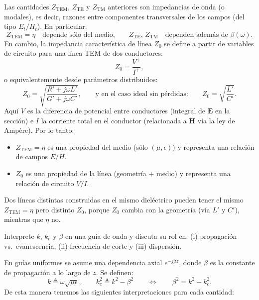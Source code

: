 \documentclass[
  11pt,
  letterpaper,
   addpoints,
   answers
  ]{exam}
\begin{document}
\begin{questions}
\begin{parts}
\begin{subparts}
\begin{solution}
\vspace{10pt}
\noindent
Las cantidades $Z_{\mathrm{TEM}}$, $Z_{\mathrm{TE}}$ y $Z_{\mathrm{TM}}$ anteriores son impedancias de onda (o modales), es decir, razones entre
componentes transversales de los campos (del tipo $E_t/H_t$). En particular:
\[
Z_{\mathrm{TEM}}=\eta \quad \text{depende sólo del medio,}
\qquad
Z_{\mathrm{TE}},\,Z_{\mathrm{TM}} \quad \text{dependen además de } \beta(\omega).
\]
En cambio, la impedancia característica de línea $Z_0$ se define a partir de variables de circuito para una línea TEM de dos conductores:
\begin{equation}
Z_0=\frac{V^+}{I^+},
\end{equation}
o equivalentemente desde parámetros distribuidos:
\begin{equation}
Z_0=\sqrt{\frac{R'+j\omega L'}{G'+j\omega C'}},
\qquad
\text{y en el caso ideal sin pérdidas:}\qquad
Z_0=\sqrt{\frac{L'}{C'}}.
\end{equation}
Aquí $V$ es la diferencia de potencial entre conductores (integral de $\mathbf{E}$ en la sección) e $I$ la corriente total en el conductor (relacionada a
$\mathbf{H}$ vía la ley de Ampère). Por lo tanto:

\begin{itemize}
\item $Z_{\mathrm{TEM}}=\eta$ es una propiedad del medio (sólo $(\mu,\epsilon)$) y representa una relación de campos $E/H$.
\item $Z_0$ es una propiedad de la línea (geometría + medio) y representa una relación de circuito $V/I$.
\end{itemize}
\noindent
Dos líneas distintas construidas en el mismo dieléctrico pueden tener el mismo $Z_{\mathrm{TEM}}=\eta$ pero distinto $Z_0$,
porque $Z_0$ cambia con la geometría (vía $L'$ y $C'$), mientras que $\eta$ no.
\end{solution}

\subpart Interprete $k$, $k_c$ y $\beta$ en una guía de onda y discuta su rol en: (i) propagación vs.\ evanescencia,
(ii) frecuencia de corte y (iii) dispersión.

\begin{solution}
En guías uniformes se asume una dependencia axial $e^{-j\beta z}$, donde $\beta$ es la constante de propagación a lo largo de $z$.
Se definen:
\[
k \triangleq \omega\sqrt{\mu\epsilon},
\qquad
k_c^2 \triangleq k^2-\beta^2
\qquad \Longleftrightarrow \qquad
\beta^2=k^2-k_c^2.
\]
De esta manera tenemos las siguientes interpretaciones para cada cantidad:


\end{solution}
\end{subparts}
\end{parts}
\end{questions}
\end{document}
